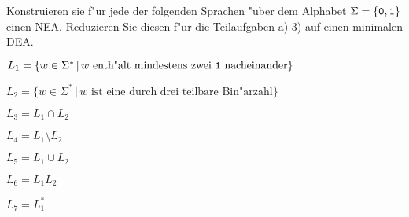 Konstruieren sie f"ur jede der folgenden Sprachen "uber dem Alphabet
$\Sigma=\{{\tt 0},{\tt 1}\}$ einen NEA. Reduzieren Sie diesen f"ur die
Teilaufgaben a)-3) auf einen minimalen DEA.
\begin{teilaufgaben}
\item $L_1=\{w\in\Sigma^*\,|\,\text{$w$ enth"alt mindestens zwei {\tt 1} nacheinander}\}$
\item $L_2=\{w\in\Sigma^*\,|\,\text{$w$ ist eine durch drei teilbare Bin"arzahl}\}$
\item $L_3=L_1\cap L_2$
\item $L_4=L_1\setminus L_2$
\item $L_5=L_1\cup L_2$
\item $L_6=L_1L_2$
\item $L_7=L_1^*$
\end{teilaufgaben}

